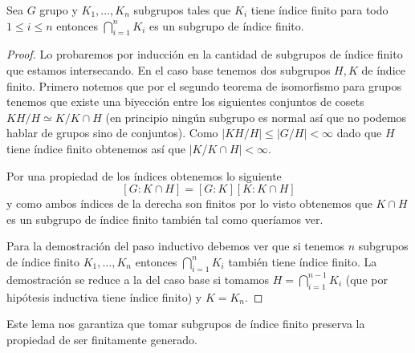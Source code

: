 \documentclass[tesis.tex]{subfiles}
\begin{document}
\begin{lema}\label{lema_indice_interseccion}
	Sea $G$ grupo y $K_1, \dots, K_n$ subgrupos tales que $K_{i}$ tiene índice finito para todo $ 1 \le i \le n $ entonces $\bigcap_{i=1}^{n} K_{i}$ es un subgrupo de índice finito.
\end{lema}
\begin{proof}
	Lo probaremos por inducción en la cantidad de subgrupos de índice finito que estamos intersecando.
	En el caso base tenemos dos subgrupos $H,K$ de índice finito.
	Primero notemos que por el segundo teorema de isomorfismo para grupos tenemos que existe una biyección entre los siguientes conjuntos de cosets $ KH / H \simeq K / K \cap H $ (en principio ningún subgrupo es normal así que no podemos hablar de grupos sino de conjuntos).
	Como  $|KH / H| \le |G / H| < \infty$ dado que $H$ tiene índice finito obtenemos así que $|K / K \cap H| < \infty$.
	
	Por una propiedad de los índices obtenemos lo siguiente
	\[
	[G:K\cap H] = [G:K][K: K \cap H]
	\]
	y como ambos índices de la derecha son finitos por lo visto obtenemos que $K \cap H$ es un subgrupo de índice finito también tal como queríamos ver.
	
	Para la demostración del paso inductivo debemos ver que si tenemos $n$ subgrupos de índice finito $K_{1}, \dots, K_{n}$ entonces $\bigcap_{i=1}^{n} K_{i}$ también tiene índice finito.
	La demostración se reduce a la del caso base si tomamos $H = \bigcap_{i=1}^{n-1} K_{i}$ (que por hipótesis inductiva tiene índice finito) y $K = K_{n}$.
\end{proof}

Este lema nos garantiza que tomar subgrupos de índice finito preserva la propiedad de ser finitamente generado.
\end{document}
